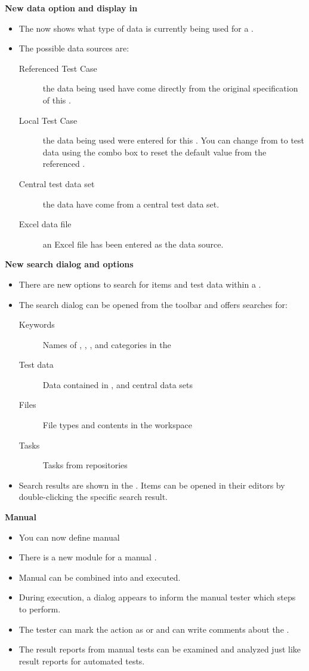 \textbf{New data option and display in \gdpropview{}}
\begin{itemize}
\item The \gdpropview{} now shows what type of data is currently being used for a \gdcase{}.
\item The possible data sources are:
\begin{description}
\item [Referenced Test Case]{the data being used have come directly from the original specification of this \gdcase{}. }
\item [Local Test Case]{the data being used were entered for this \gdcase{}. You can change from  to  test data using the combo box to reset the default value from the referenced \gdcase{}.}
\item [Central test data set]{the data have come from a central test data set.}
\item [Excel data file]{an Excel file has been entered as the data source.}
\end{description}
\end{itemize}

\textbf{New search dialog and options}
\begin{itemize}
\item There are new options to search for items and test data within a \gdproject{}.
\item The search dialog can be opened from the toolbar and offers searches for:
\begin{description}
\item [Keywords]{Names of \gdsteps{}, \gdcases{}, \gdsuites{}, \gdjobs{} and categories in the \gdproject{}}
\item [Test data]{Data contained in \gdcases{}, \gdsteps{} and central data sets}
\item [Files]{File types and contents in the workspace}
\item [Tasks]{Tasks from repositories}
\end{description}
\item Search results are shown in the \gdsearchresultview{}. Items can be opened in their editors by double-clicking the specific search result. 
\end{itemize}

\textbf{Manual \gdsteps{}}
\begin{itemize}
\item You can now define manual \gdcases{}
\item There is a new module for a manual \gdstep{}.
\item Manual \gdcases{} can be combined into \gdsuites{} and executed.
\item During execution, a dialog appears to inform the manual tester which steps to perform.
\item The tester can mark the action as  or  and can write comments about the \gdstep{}.
\item The result reports from manual tests can be examined and analyzed just like result reports for automated tests.
\end{itemize}

